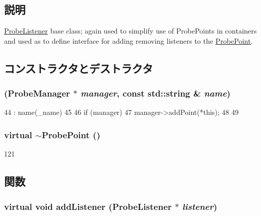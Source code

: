 \subsection{説明}
\hyperlink{classProbeListener}{ProbeListener} base class; again used to simplify use of ProbePoints in containers and used as to define interface for adding removing listeners to the \hyperlink{classProbePoint}{ProbePoint}. 

\subsection{コンストラクタとデストラクタ}
\hypertarget{classProbePoint_ac8c9fdc08f4c2b6c361b6abab2d56895}{
\subsubsection[{ProbePoint}]{ ({\bf ProbeManager} $\ast$ {\em manager}, \/  const std::string \& {\em name})}}
\label{classProbePoint_ac8c9fdc08f4c2b6c361b6abab2d56895}



\begin{DoxyCode}
44     : name(_name)
45 {
46     if (manager) {
47         manager->addPoint(*this);
48     }
49 }
\end{DoxyCode}
\hypertarget{classProbePoint_a26266ccd26aa2058bf2bdf7ba13e00f2}{
\subsubsection[{$\sim$ProbePoint}]{\setlength{\rightskip}{0pt plus 5cm}virtual $\sim${\bf ProbePoint} ()}}
\label{classProbePoint_a26266ccd26aa2058bf2bdf7ba13e00f2}



\begin{DoxyCode}
121 {}
\end{DoxyCode}


\subsection{関数}
\hypertarget{classProbePoint_a6faaaab14f1e331042dbc6a84d74854b}{
\subsubsection[{addListener}]{\setlength{\rightskip}{0pt plus 5cm}virtual void addListener ({\bf ProbeListener} $\ast$ {\em listener})}}
\label{classProbePoint_a6faaaab14f1e331042dbc6a84d74854b}


